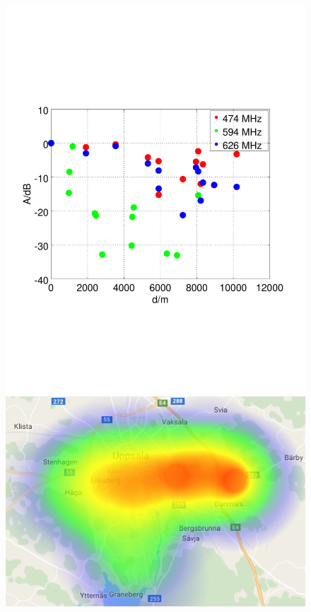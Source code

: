 \begin{figure}[h]
	\centering
	\begin{minipage}{0.49\columnwidth}
	\includegraphics[width=\columnwidth]{./fig/haversine}
	\end{minipage}
	\hfill
	\begin{minipage}{0.49\columnwidth}
	\includegraphics[width=\columnwidth]{./fig/heatmap_626mhz}

\end{minipage}
\end{figure}
